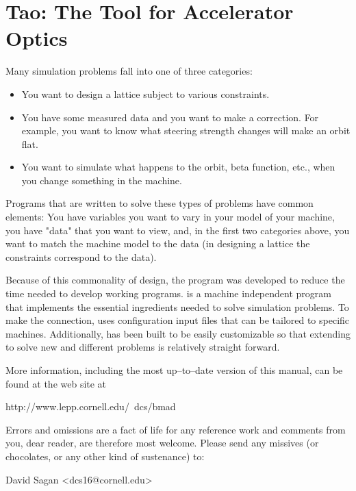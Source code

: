 \section*{Tao: The Tool for Accelerator Optics}

Many simulation problems fall into one of three categories: 

\begin{itemize}
\item 
You want to design a lattice subject to various constraints.
\item 
You have some measured data and you want to make a correction. For
example, you want to know what steering strength changes will make an orbit
flat.
\item
You want to simulate what happens to the orbit, beta function,
etc., when you change something in the machine.
\end{itemize}

Programs that are written to solve these types of problems have common
elements: You have variables you want to vary in your model of your
machine, you have "data" that you want to view, and, in the first two
categories above, you want to match the machine model to the data (in
designing a lattice the constraints correspond to the data).

Because of this commonality of design, the \tao program was developed
to reduce the time needed to develop working programs. \tao is a
machine independent program that implements the essential ingredients
needed to solve simulation problems. To make the
connection, \tao uses configuration input files that can be tailored to
specific machines. Additionally, \tao has been built
to be easily customizable so that extending \tao to solve new and
different problems is relatively straight forward.

More information, including the most up--to--date version of this
manual, can be found at the \bmad web site at
\begin{example}
  http://www.lepp.cornell.edu/~dcs/bmad
\end{example}

Errors and omissions are a fact of life for any reference work and
comments from you, dear reader, are therefore most welcome. Please
send any missives (or chocolates, or any other kind of sustenance) to:
\begin{example}
  David Sagan <dcs16@cornell.edu>
\end{example}